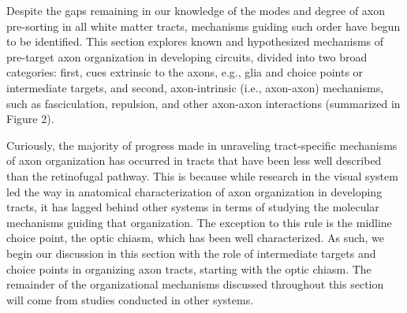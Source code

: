 \label{sec:MoleculesMechanisms}

Despite the gaps remaining in our knowledge of the modes and degree of axon pre-sorting in all white matter tracts, mechanisms guiding such order have begun to be identified.
This section explores known and hypothesized mechanisms of pre-target axon organization in developing circuits, divided into two broad categories: first, cues extrinsic to the axons, e.g., glia and choice points or intermediate targets, and second, axon-intrinsic (i.e., axon-axon) mechanisms, such as fasciculation, repulsion, and other axon-axon interactions (summarized in Figure 2).

Curiously, the majority of progress made in unraveling tract-specific mechanisms of axon organization has occurred in tracts that have been less well described than the retinofugal pathway.
This is because while research in the visual system led the way in anatomical characterization of axon organization in developing tracts, it has lagged behind other systems in terms of studying the molecular mechanisms guiding that organization.
The exception to this rule is the midline choice point, the optic chiasm, which has been well characterized. As such, we begin our discussion in this section with the role of intermediate targets and choice points in organizing axon tracts, starting with the optic chiasm.
The remainder of the organizational mechanisms discussed throughout this section will come from studies conducted in other systems.
